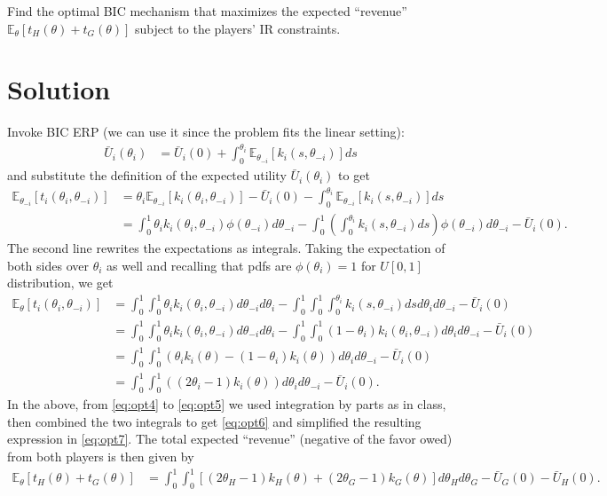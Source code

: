 \documentclass[a4paper]{article}
\newif\ifsolutions
\begin{document}
Find the optimal BIC mechanism that maximizes the expected ``revenue'' $\mathbb{E}_\theta[t_H(\theta)+t_G(\theta)]$ subject to the players' IR constraints.


\ifsolutions
\section*{Solution}
	Invoke BIC ERP (we can use it since the problem fits the linear setting):
	\begin{align}
		\bar{U}_i(\theta_i) &= \bar{U}_i(0) + \int_0^{\theta_i} \mathbb{E}_{\theta_{-i}} [k_i(s,\theta_{-i})] ds
	\end{align}
	and substitute the definition of the expected utility $\bar{U}_i(\theta_i)$ to get
	\begin{align}
		\mathbb{E}_{\theta_{-i}} [t_i(\theta_i,\theta_{-i})] 
		&= \theta_i \mathbb{E}_{\theta_{-i}} [k_i(\theta_i,\theta_{-i})] - \bar{U}_i(0) - \int_0^{\theta_i} \mathbb{E}_{\theta_{-i}} [k_i(s,\theta_{-i})] ds
		\\
		&= \int_0^1 \theta_i k_i(\theta_i,\theta_{-i}) \phi(\theta_{-i}) d\theta_{-i} - \int_0^1 \left( \int_0^{\theta_i} k_i(s,\theta_{-i}) ds \right) \phi(\theta_{-i}) d\theta_{-i} - \bar{U}_i(0).
	\end{align}
	The second line rewrites the expectations as integrals. Taking the expectation of both sides over $\theta_i$ as well and recalling that pdfs are $\phi(\theta_i)=1$ for $U[0,1]$ distribution, we get
	\begin{align}
		\mathbb{E}_{\theta} [t_i(\theta_i,\theta_{-i})] 
		&= \int_0^1 \int_0^1 \theta_i k_i(\theta_i,\theta_{-i}) d\theta_{-i} d\theta_{i} - \int_0^1 \int_0^1 \int_0^{\theta_i} k_i(s,\theta_{-i}) ds d\theta_{i} d\theta_{-i} - \bar{U}_i(0)
		\label{eq:opt4}
		\\
		&= \int_0^1 \int_0^1 \theta_i k_i(\theta_i,\theta_{-i}) d\theta_{-i} d\theta_{i} - \int_0^1 \int_0^1 (1-\theta_i) k_i(\theta_i,\theta_{-i}) d\theta_{i} d\theta_{-i} - \bar{U}_i(0)
		\label{eq:opt5}
		\\
		&= \int_0^1 \int_0^1 \left( \theta_i k_i(\theta) - (1-\theta_i) k_i(\theta) \right) d\theta_{i} d\theta_{-i} - \bar{U}_i(0)
		\label{eq:opt6}
		\\
		&= \int_0^1 \int_0^1 \left( (2\theta_i - 1) k_i(\theta) \right) d\theta_{i} d\theta_{-i} - \bar{U}_i(0).
		\label{eq:opt7}
	\end{align}
	In the above, from \eqref{eq:opt4} to \eqref{eq:opt5} we used integration by parts as in class, then combined the two integrals to get \eqref{eq:opt6} and simplified the resulting expression in \eqref{eq:opt7}. The total expected ``revenue'' (negative of the favor owed) from both players is then given by
	\begin{align}
		\mathbb{E}_\theta \left[ t_H(\theta)+t_G(\theta) \right] 
		&= \int_0^1 \int_0^1 \left[ (2\theta_H - 1) k_H(\theta) + (2\theta_G - 1) k_G(\theta) \right] d\theta_H d\theta_G - \bar{U}_G(0) - \bar{U}_H(0).
		\label{eq:opt8}
	\end{align}
	
\end{document}
